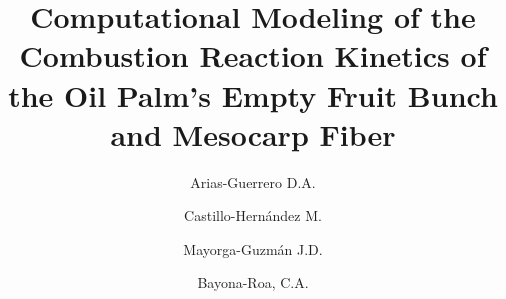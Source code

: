 \documentclass[preprint,12pt]{elsarticle}
\begin{document}
\begin{frontmatter}



\title{Computational Modeling of the Combustion Reaction Kinetics of the Oil Palm's Empty Fruit Bunch and Mesocarp Fiber}

\author[label1]{Arias-Guerrero D.A.}
\author[label1]{Castillo-Hernández M.}
\author[label1]{Mayorga-Guzmán J.D.}
\author[label1]{Bayona-Roa, C.A.}



\end{frontmatter}
\end{document}
